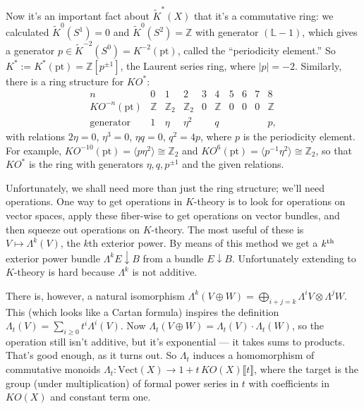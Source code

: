 \documentclass{article}
\newcommand{\Z}{\mathbb{Z}}
\newcommand{\bundle}[1]{\mathbb{#1}}
\newcommand{\ptspace}{\mathrm{pt}}
\begin{document}
Now it's an important fact about $\widetilde K^* (X)$ that it's a commutative ring: we calculated $\widetilde K^0 (S^1) = 0$ and $\widetilde K^0 (S^2) = \Z$ with generator $(\bundle{L} - 1)$, which gives a generator $p \in \widetilde K^{-2} (S^0) = K^{-2} (\ptspace)$, called the ``periodicity element.''  So $K^* := K^* (\ptspace) = \Z[p^{\pm 1}]$, the Laurent series ring, where $|p| = -2$.  Similarly, there is a ring structure for $KO^*$:
\[
\begin{array}{c|ccccccccc}
n & 0 & 1 & 2 & 3 & 4 & 5 & 6 & 7 & 8 \\
\hline
KO^{-n} (\ptspace) & \Z & \Z_2 & \Z_2 & 0 & \Z & 0 & 0 & 0 & \Z \\
\mathrm{generator} & 1 & \eta & \eta^2 & & q & & & & p,
\end{array}
\]
with relations $2\eta = 0$, $\eta^3 = 0$, $\eta q = 0$, $q^2 = 4p$, where $p$ is the periodicity element. For example, $KO^{-10}(\ptspace) = \langle p\eta^2 \rangle \cong \Z_2$ and $KO^{6}(\ptspace) = \langle p^{-1}\eta^2 \rangle \cong \Z_2$, so that $KO^*$ is the ring with generators $\eta,q,p^{\pm1}$ and the given relations.

Unfortunately, we shall need more than just the ring structure; we'll need operations.  One way to get operations in $K$-theory is to look for operations on vector spaces, apply these fiber-wise to get operations on vector bundles, and then squeeze out operations on $K$-theory.  The most useful of these is $V \mapsto \Lambda^k(V)$, the $k$th exterior power.  By means of this method we get a $k^\textup{th}$ exterior power bundle $\Lambda^k E \downarrow B$ from a bundle $E\downarrow B$.  Unfortunately extending to $K$-theory is hard because $\Lambda^k$ is not additive. 

There is, however, a natural isomorphism $\Lambda^k(V \oplus W) = \bigoplus_{i+j = k} \Lambda^i V \otimes \Lambda^j W$.  This (which looks like a Cartan formula) inspires the definition $\Lambda_t(V) = \sum_{i \ge 0} t^i \Lambda^i(V)$.  Now $\Lambda_t(V \oplus W) = \Lambda_t(V) \cdot \Lambda_t(W)$, so the operation still isn't additive, but it's exponential --- it takes sums to products.  That's good enough, as it turns out.  So $\Lambda_t$ induces a homomorphism of commutative monoids $\Lambda_t: \mathrm{Vect}(X) \to 1 + t\,KO(X)\llbracket t \rrbracket$, where the target is the group (under multiplication) of formal power series in $t$ with coefficients in $KO(X)$ and constant term one.
\end{document}
